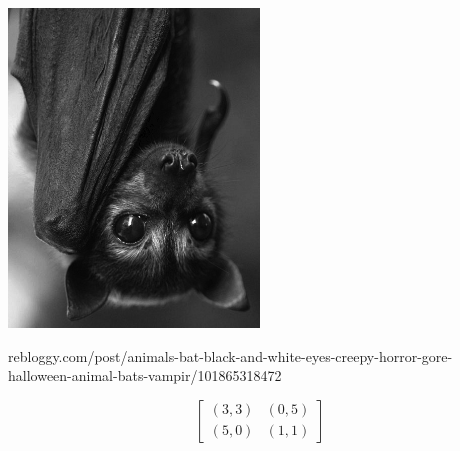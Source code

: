 \documentclass{beamer}
\begin{document}
\begin{frame}
    \begin{center}
    \includegraphics[width=0.5\textwidth]{static/vampire_bat.jpg}\vspace{.7cm}

    \scriptsize{rebloggy.com/post/animals-bat-black-and-white-eyes-creepy-horror-gore-halloween-animal-bats-vampir/101865318472}
    \end{center}
\end{frame}

\begin{frame}
    \begin{center}
    \LARGE{
        \begin{equation*}
            \begin{bmatrix}
                (3, 3) & (0, 5)  \\
                (5, 0) & (1, 1)
            \end{bmatrix}
        \end{equation*}}
    \end{center}
\end{frame}

\begin{frame}
    \begin{center}
    
    \end{center}
\end{frame}

\begin{frame}
    \begin{center}
    
    \end{center}
\end{frame}
\end{document}
